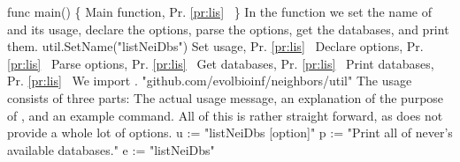 func main() \{
          \LA{}Main function, Pr. \ref{pr:lis}~{\nwtagstyle{}}\RA{}
\}
\nwendcode{}\nwdocspar
\epr In the  function we set the name of  and its
usage, declare the options, parse the options, get the databases, and
print them.
\nwenddocs{}\endmoddef\nwstartdeflinemarkup{}\nwenddeflinemarkup
util.SetName("listNeiDbs")
\LA{}Set usage, Pr. \ref{pr:lis}~{\nwtagstyle{}}\RA{}
\LA{}Declare options, Pr. \ref{pr:lis}~{\nwtagstyle{}}\RA{}
\LA{}Parse options, Pr. \ref{pr:lis}~{\nwtagstyle{}}\RA{}
\LA{}Get databases, Pr. \ref{pr:lis}~{\nwtagstyle{}}\RA{}
\LA{}Print databases, Pr. \ref{pr:lis}~{\nwtagstyle{}}\RA{}
\nwendcode{}\nwdocspar
We import .
\nwenddocs{}\endmoddef\nwstartdeflinemarkup{}\nwenddeflinemarkup
"github.com/evolbioinf/neighbors/util"
\nwendcode{}\nwdocspar
The usage consists of three parts: The actual usage message, an
explanation of the purpose of , and an example command.
All of this is rather straight forward, as  does not provide
a whole lot of options.
\nwenddocs{}\endmoddef\nwstartdeflinemarkup{}\nwenddeflinemarkup
u := "listNeiDbs [option]"
p := "Print all of never's available databases."
e := "listNeiDbs"

